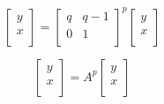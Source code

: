 \documentclass[paper.tex]{subfiles}
\begin{document}
\[ 
\left[ \begin{array}{ccc}
y \\
x \\
\end{array} \right] 
=
\left[ \begin{array}{ccc}
q & q-1 \\
0 & 1 \\
\end{array} \right] ^{p}
\left[ \begin{array}{ccc}
y \\
x \\
\end{array} \right]
\] 

\[ 
\left[ \begin{array}{ccc}
y \\
x \\
\end{array} \right] 
=
A^{p}
\left[ \begin{array}{ccc}
y \\
x \\
\end{array} \right]
\] 
\end{document}
